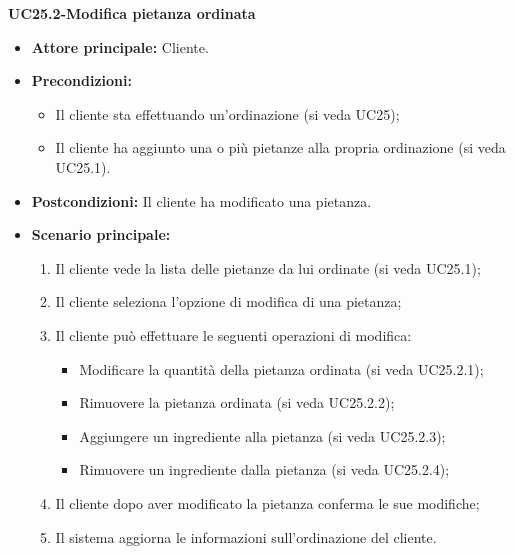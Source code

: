\textbf{UC25.2-Modifica pietanza ordinata}
\begin{itemize}
\item \textbf{Attore principale:} Cliente.
\item \textbf{Precondizioni:} 
\begin{itemize}
    \item Il cliente sta effettuando un'ordinazione (si veda UC25);
    \item Il cliente ha aggiunto una o più pietanze alla propria ordinazione (si veda UC25.1).
\end{itemize}
\item \textbf{Postcondizioni:} Il cliente ha modificato una pietanza.
\item \textbf{Scenario principale:}
\begin{enumerate}
    \item Il cliente vede la lista delle pietanze da lui ordinate (si veda UC25.1);
    \item Il cliente seleziona l'opzione di modifica di una pietanza;
    \item Il cliente può effettuare le seguenti operazioni di modifica:
    \begin{itemize}
        \item Modificare la quantità della pietanza ordinata (si veda UC25.2.1);
        \item Rimuovere la pietanza ordinata (si veda UC25.2.2);
        \item Aggiungere un ingrediente alla pietanza (si veda UC25.2.3);
        \item Rimuovere un ingrediente dalla pietanza (si veda UC25.2.4);
    \end{itemize}
    \item Il cliente dopo aver modificato la pietanza conferma le sue modifiche;
    \item Il sistema aggiorna le informazioni sull'ordinazione del cliente.
\end{enumerate}
\end{itemize}

